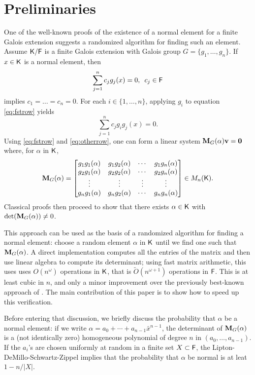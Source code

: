 \section{Preliminaries}
\label{sec:pre}

One of the well-known proofs of the existence of a normal element for a
finite Galois extension \cite[Theorem 6.13.1]{Lang} suggests a randomized
algorithm for finding such an element. Assume ${\mathsf{K}}/{\mathsf{F}}$ is a finite Galois
extension with Galois group $G = \lbrace g_1 , \ldots , g_n \rbrace$. If
$x \in {\mathsf{K}}$ is a normal element, then 
\begin{equation}
  \label{eq:fstrow}
  \sum_{j=1}^n 
  c_j g_j(x)=0, \,\,\, c_j \in {\mathsf{F}} 
\end{equation} 
implies $c_1 =\ldots=c_n = 0$. For each $i \in \lbrace 1, \ldots , n\rbrace$, applying $g_i$ to equation \eqref{eq:fstrow} yields
\begin{equation} \label{eq:otherrow}
 \sum_{j=1}^n 
 c_j g_i g_j(x)=0.
\end{equation}
Using \eqref{eq:fstrow} and \eqref{eq:otherrow}, one can form a linear
system $\mat{M}_G(\alpha)\textbf{v} = \textbf{0}$ where, for $\alpha$ in
${\mathsf{K}}$,
\[
  \mat M_G(\alpha) =
  \begin{bmatrix}
    g_1 g_1(\alpha) & g_1 g_2(\alpha) & \cdots & g_1 g_n(\alpha) \\
    g_2 g_1(\alpha) & g_2 g_2(\alpha) & \cdots & g_2 g_n(\alpha) \\
    \vdots		& \vdots	& \vdots & \vdots \\
    g_n g_1(\alpha) & g_n g_2(\alpha) & \cdots & g_n g_n(\alpha) \\
  \end{bmatrix} \in M_n(\K).
\]
Classical proofs then proceed to show that there exists $\alpha \in {\mathsf{K}}$
with $\det(\mat M_G(\alpha))\neq 0$.
 
This approach can be used as the basis of a randomized algorithm for
finding a normal element: choose a random element $\alpha$ in ${\mathsf{K}}$ until we
find one such that $ \mat M_G(\alpha)$. A direct implementation computes
all the entries of the matrix and then use linear algebra to compute its
determinant; using fast matrix arithmetic, this uses uses $O(n^\omega)$
operations in ${\mathsf{K}}$, that is $\tilde{O}(n^{\omega+1})$ operations in
${\mathsf{F}}$. This is at least cubic in $n$, and only a minor improvement over the
previously best-known approach of . The main contribution
of this paper is to show how to speed up this verification.
 
Before entering that discussion, we briefly discuss the probability
that $\alpha$ be a normal element: if we write $\alpha = a_0 + \cdots
+ a_{n-1} \bar x^{n-1}$, the determinant of $\mat M_G(\alpha)$ is a
(not identically zero) homogeneous polynomial of degree $n$ in
$(a_0,\dots,a_{n-1})$. If the $a_i$'s are chosen uniformly at random
in a finite set $X \subset {\mathsf{F}}$, the Lipton-DeMillo-Schwartz-Zippel
implies that the probability that $\alpha$ be normal is at leat
$1-n/|X|$.

